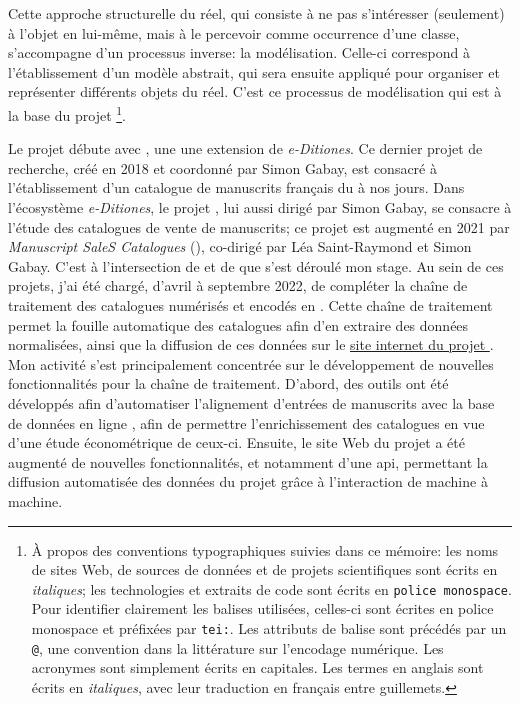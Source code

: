 Cette approche structurelle du réel, qui consiste à ne pas s'intéresser (seulement) à l'objet en lui-même, mais à le percevoir comme occurrence d'une classe, s'accompagne d'un processus inverse: la modélisation. Celle-ci correspond à l'établissement d'un modèle abstrait, qui sera ensuite appliqué pour organiser et représenter différents objets du réel. C'est ce processus de modélisation qui est à la base du projet \mssktb{}\footnote{
	À propos des conventions typographiques suivies dans ce mémoire: les noms de sites Web, de sources de données et de projets scientifiques sont écrits en \textit{italiques}; les technologies et extraits de code sont écrits en \texttt{police monospace}. Pour identifier clairement les balises \tei{} utilisées, celles-ci sont écrites en police monospace et préfixées par \texttt{tei:}. Les attributs de balise sont précédés par un \texttt{@}, une convention dans la littérature sur l'encodage numérique. Les acronymes sont simplement écrits en capitales. Les termes en anglais sont écrits en \textit{italiques}, avec leur traduction en français entre guillemets.
}.

Le projet débute avec \ktb{}, une une extension de \textit{e-Ditiones}. Ce dernier projet de recherche, créé en 2018 et coordonné par Simon Gabay, est consacré à l'établissement d'un catalogue de manuscrits français du  à nos jours. Dans l'écosystème \textit{e-Ditiones}, le projet \ktb{}, lui aussi dirigé par Simon Gabay, se consacre à l'étude des catalogues de vente de manuscrits; ce projet est augmenté en 2021 par \textit{Manuscript SaleS Catalogues} (\mss{}), co-dirigé par Léa Saint-Raymond et Simon Gabay. C'est à l'intersection de \mss{} et de \ktb{} que s'est déroulé mon stage. Au sein de ces projets, j'ai été chargé, d'avril à septembre 2022, de compléter la chaîne de traitement des catalogues numérisés et encodés en \xmltei{}. Cette chaîne de traitement permet la fouille automatique des catalogues afin d'en extraire des données normalisées, ainsi que la diffusion de ces données sur le \href{https://katabase.huma-num.fr/}{site internet du projet \ktb{}}. Mon activité s'est principalement concentrée sur le développement de nouvelles fonctionnalités pour la chaîne de traitement. D'abord, des outils ont été développés afin d'automatiser l'alignement d'entrées de manuscrits avec la base de données en ligne \wkd{}, afin de permettre l'enrichissement des catalogues en vue d'une étude économétrique de ceux-ci. Ensuite, le site Web du projet a été augmenté de nouvelles fonctionnalités, et notamment d'une \gls{api}, permettant la diffusion automatisée des données du projet grâce à l'interaction de machine à machine.

